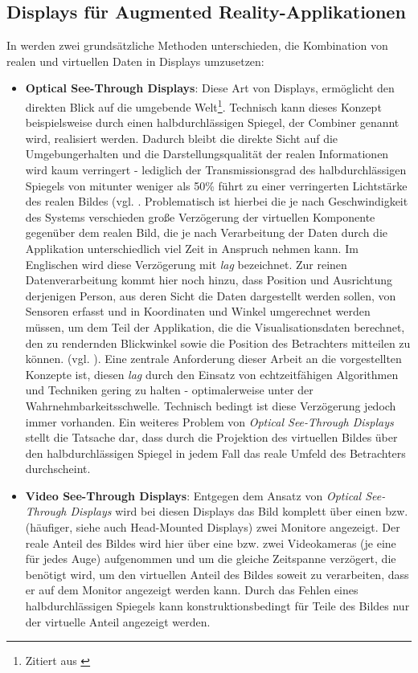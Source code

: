 \documentclass[pdftex,a4paper,titlepage,12pt]{scrartcl}
\newtheorem[L]{boxedDefinition}{Definition}
\newcommand{\footnoteremember}[2]{\footnote{#2}\newcounter{#1}\setcounter{#1}{\value{footnote}}}
\newcommand{\footnoterecall}[1]{\footnotemark[\value{#1}]}
\begin{document}
\subsection{Displays für Augmented Reality-Applikationen}\label{ssec:ardisplays}
In \cite[Kapitel 2.2, Seite 21]{Toe2010} werden zwei grundsätzliche Methoden unterschieden, die Kombination von realen und virtuellen Daten in Displays umzusetzen:
\begin{itemize}
 \item \textbf{Optical See-Through Displays}: Diese Art von Displays, ermöglicht den \glqq direkten Blick auf die umgebende Welt\grqq\footnoteremember{f:Toe2010-S21}{Zitiert aus \cite[Kapitel 2.2, Seite 21f.]{Toe2010}}. Technisch kann dieses Konzept beispielsweise durch einen halbdurchlässigen Spiegel, der Combiner genannt wird, realisiert werden. Dadurch bleibt die \glqq direkte Sicht auf die Umgebung\grqq\footnoterecall{f:Toe2010-S21} erhalten und die Darstellungsqualität der realen Informationen wird kaum verringert - lediglich der Transmissionsgrad des halbdurchlässigen Spiegels von mitunter weniger als 50\% führt zu einer verringerten Lichtstärke des realen Bildes (vgl. \cite[Kapitel 3.1.3, Seite 7]{Suthau2002DE}. Problematisch ist hierbei die je nach Geschwindigkeit des Systems verschieden große Verzögerung der virtuellen Komponente gegenüber dem realen Bild, die je nach Verarbeitung der Daten durch die Applikation unterschiedlich viel Zeit in Anspruch nehmen kann. Im Englischen wird diese Verzögerung mit \textit{lag} bezeichnet. Zur reinen Datenverarbeitung kommt hier noch hinzu, dass Position und Ausrichtung derjenigen Person, aus deren Sicht die Daten dargestellt werden sollen, von Sensoren erfasst und in Koordinaten und Winkel umgerechnet werden müssen, um dem Teil der Applikation, die die Visualisationsdaten berechnet, den zu rendernden Blickwinkel sowie die Position des Betrachters mitteilen zu können. (vgl. \cite[Kapitel 2.2, Seite 21f.]{Toe2010}). Eine zentrale Anforderung dieser Arbeit an die vorgestellten Konzepte ist, diesen \textit{lag} durch den Einsatz von echtzeitfähigen Algorithmen und Techniken gering zu halten - optimalerweise unter der Wahrnehmbarkeitsschwelle. Technisch bedingt ist diese Verzögerung jedoch immer vorhanden. Ein weiteres Problem von \textit{Optical See-Through Displays} stellt die Tatsache dar, dass durch die Projektion des virtuellen Bildes über den halbdurchlässigen Spiegel in jedem Fall das reale Umfeld des Betrachters durchscheint.
 \item \textbf{Video See-Through Displays}: Entgegen dem Ansatz von \textit{Optical See-Through Displays} wird bei diesen Displays das Bild komplett über einen bzw. (häufiger, siehe auch \glqq Head-Mounted Displays\grqq) zwei Monitore angezeigt. Der reale Anteil des Bildes wird hier über eine bzw. zwei Videokameras (je eine für jedes Auge) aufgenommen und um die gleiche Zeitspanne verzögert, die benötigt wird, um den virtuellen Anteil des Bildes soweit zu verarbeiten, dass er auf dem Monitor angezeigt werden kann. Durch das Fehlen eines halbdurchlässigen Spiegels kann konstruktionsbedingt für Teile des Bildes nur der virtuelle Anteil angezeigt werden.

\end{itemize}
\end{document}
